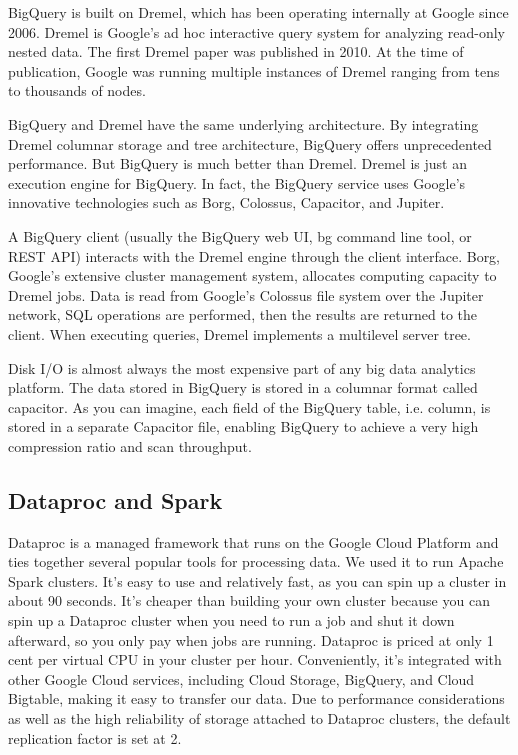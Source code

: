 \documentclass[a4paper,12pt]{article}
\begin{document}
BigQuery is built on  Dremel\cite{Dremel}, which has been operating internally at Google since 2006. Dremel is Google's
ad hoc interactive query system for analyzing read-only nested data. The first Dremel paper was published in 2010.
At the time of publication, Google was running multiple instances of Dremel ranging from tens to thousands of nodes.

BigQuery and Dremel have the same underlying architecture. By integrating Dremel columnar storage and tree architecture,
BigQuery offers unprecedented performance. But BigQuery is much better than Dremel. Dremel is just an execution engine for BigQuery. In fact, the BigQuery service uses Google's innovative technologies such as Borg\cite{Borg}, Colossus, Capacitor, and Jupiter.

A BigQuery client (usually the BigQuery web UI, bg command line tool, or REST API) interacts with the Dremel engine through
the client interface. Borg, Google's extensive cluster management system, allocates computing capacity to Dremel jobs.
Data is read from Google's Colossus file system over the Jupiter network, SQL operations are performed, then the results
are returned to the client. When executing queries, Dremel implements a multilevel server tree.

Disk I/O is almost always the most expensive part of any big data analytics platform. The data stored in BigQuery is
stored in a columnar format called capacitor\cite{StoringDremel}. As you can imagine, each field of the BigQuery table,
i.e. column, is stored in a separate Capacitor file, enabling BigQuery to achieve a very high compression ratio and
scan throughput.

\subsection{Dataproc and Spark}
\label{sec:spark}
Dataproc is a managed framework that runs on the Google Cloud Platform and ties together several popular tools for processing data.
We used it to run Apache Spark clusters. It's easy to use and relatively fast, as you can spin up a cluster in about 90 seconds.
It’s cheaper than building your own cluster because you can spin up a Dataproc cluster when you need to run a job and
shut it down afterward, so you only pay when jobs are running. Dataproc is priced at only 1 cent per virtual CPU in your
cluster per hour. Conveniently, it’s integrated with other Google Cloud services, including Cloud Storage, BigQuery, and
Cloud Bigtable, making it easy to transfer our data. Due to performance considerations as well as the high reliability of
storage attached to Dataproc clusters, the default replication factor is set at 2.
\end{document}
